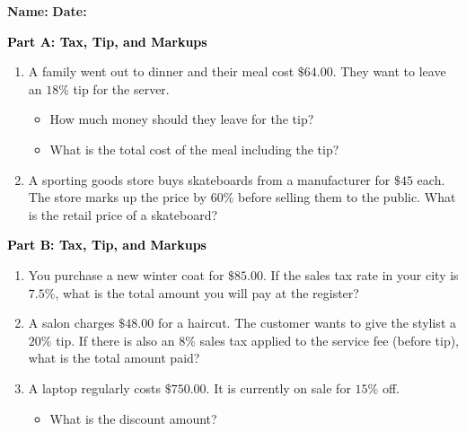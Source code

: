 \documentclass[12pt, letterpaper, fleqn]{article}
\begin{document}
\textbf{Name:} \underline{\hspace{5cm}}
\hfill
\textbf{Date:} \underline{\hspace{3cm}}\\

\begin{tcolorbox}[colback=customteal!20]
\large\textcolor{black}{\textbf{Part A: Tax, Tip, and Markups}}
\end{tcolorbox}

\vspace{3mm}

\begin{enumerate}[itemsep=4.2cm, leftmargin=0.6cm]
\item A family went out to dinner and their meal cost $\$64.00$. They want to leave an $18\%$ tip for the server. 
\begin{itemize}
\item How much money should they leave for the tip?
\item What is the total cost of the meal including the tip?
\end{itemize}
\item A sporting goods store buys skateboards from a manufacturer for $\$45$ each. The store marks up the price by $60\%$ before selling them to the public. What is the retail price of a skateboard?
\end{enumerate}

\newpage

\begin{tcolorbox}[colback=customteal!20]
\large\textcolor{black}{\textbf{Part B: Tax, Tip, and Markups}}
\end{tcolorbox}

\vspace{3mm}

\begin{enumerate}[itemsep=4.2cm, leftmargin=0.6cm, resume]
\item You purchase a new winter coat for $\$85.00$. If the sales tax rate in your city is $7.5\%$, what is the total amount you will pay at the register?
\item A salon charges $\$48.00$ for a haircut. The customer wants to give the stylist a $20\%$ tip. If there is also an $8\%$ sales tax applied to the service fee (before tip), what is the total amount paid?
\item A laptop regularly costs $\$750.00$. It is currently on sale for $15\%$ off. 
\begin{itemize}
\item What is the discount amount?
\end{itemize}
\end{enumerate}
\end{document}
